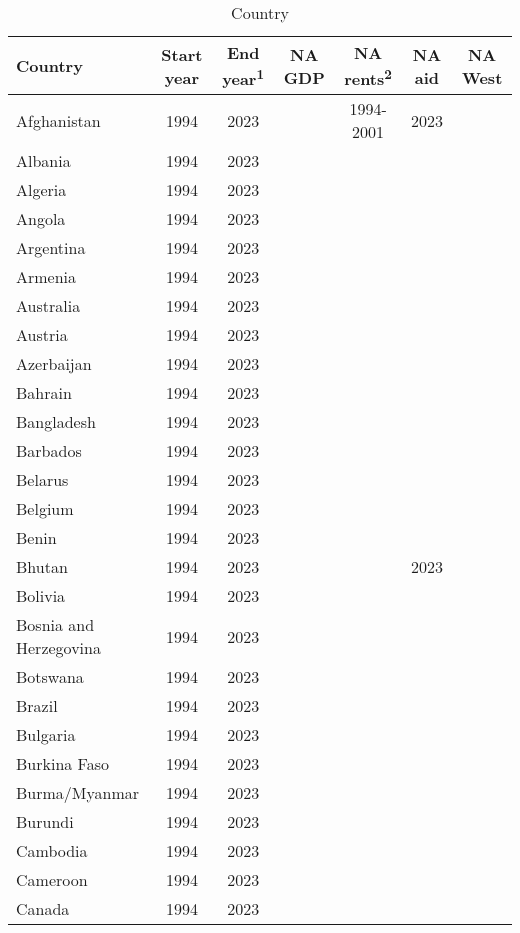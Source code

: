 {\fontsize{8pt}{8pt}\selectfont\tabcolsep=2pt\centering  %
\begin{longtable}{lcccccc}
\caption{Country}
\label{tab:country} \\ %
\toprule
Country & Start year & End year\textsuperscript{1} & NA GDP & NA rents\textsuperscript{2} & NA aid & NA West\\
\midrule
Afghanistan & 1994 & 2023 &  & 1994-2001 & 2023 & \\
Albania & 1994 & 2023 &  &  &  & \\
Algeria & 1994 & 2023 &  &  &  & \\
Angola & 1994 & 2023 &  &  &  & \\
Argentina & 1994 & 2023 &  &  &  & \\
\addlinespace
Armenia & 1994 & 2023 &  &  &  & \\
Australia & 1994 & 2023 &  &  &  & \\
Austria & 1994 & 2023 &  &  &  & \\
Azerbaijan & 1994 & 2023 &  &  &  & \\
Bahrain & 1994 & 2023 &  &  &  & \\
\addlinespace
Bangladesh & 1994 & 2023 &  &  &  & \\
Barbados & 1994 & 2023 &  &  &  & \\
Belarus & 1994 & 2023 &  &  &  & \\
Belgium & 1994 & 2023 &  &  &  & \\
Benin & 1994 & 2023 &  &  &  & \\
\addlinespace
Bhutan & 1994 & 2023 &  &  & 2023 & \\
Bolivia & 1994 & 2023 &  &  &  & \\
Bosnia and Herzegovina & 1994 & 2023 &  &  &  & \\
Botswana & 1994 & 2023 &  &  &  & \\
Brazil & 1994 & 2023 &  &  &  & \\
\addlinespace
Bulgaria & 1994 & 2023 &  &  &  & \\
Burkina Faso & 1994 & 2023 &  &  &  & \\
Burma/Myanmar & 1994 & 2023 &  &  &  & \\
Burundi & 1994 & 2023 &  &  &  & \\
Cambodia & 1994 & 2023 &  &  &  & \\
\addlinespace
Cameroon & 1994 & 2023 &  &  &  & \\
Canada & 1994 & 2023 &  &  &  & \\

\end{longtable}}
